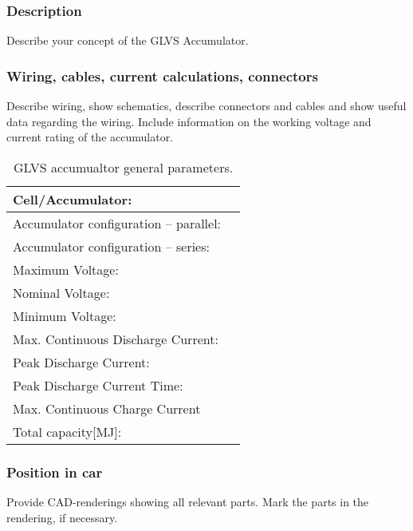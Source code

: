 \subsubsection{Description}
Describe your concept of the GLVS Accumulator.

\subsubsection{Wiring, cables, current calculations, connectors}
Describe wiring, show schematics, describe connectors and cables and show useful data regarding the wiring.  Include information on the working voltage and current rating of the accumulator.

\begin{table}[H]
	\centering
	\caption{GLVS accumualtor general parameters.}
	\begin{tabularx}{\textwidth}{|X|X|}\hline
		Cell/Accumulator: & \\[\TableSize]\hline
		Accumulator configuration – parallel: & \\[\TableSize]\hline
		Accumulator configuration – series: & \\[\TableSize]\hline
		Maximum Voltage: &  \\[\TableSize]\hline
		Nominal Voltage: &  \\[\TableSize]\hline
		Minimum Voltage: &  \\[\TableSize]\hline
		Max. Continuous Discharge Current: &  \\[\TableSize]\hline
		Peak Discharge Current: &  \\[\TableSize]\hline
		Peak Discharge Current Time: &  \\[\TableSize]\hline
		Max. Continuous Charge Current &  \\[\TableSize]\hline
		Total capacity[MJ]: &  \\[\TableSize]\hline
	\end{tabularx}%
	\label{tab:LVbatt-general}%
\end{table}%

\subsubsection{Position in car}
Provide CAD-renderings showing all relevant parts. Mark the parts in the rendering, if necessary.